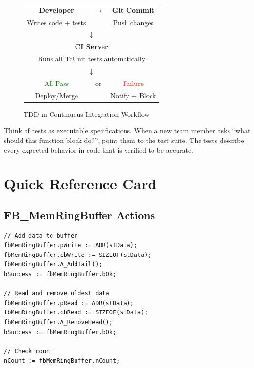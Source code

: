 \documentclass[11pt,a4paper]{article}
\begin{document}
\begin{figure}[h]
\centering
\begin{tabular}{|c|c|c|}
\hline
\textbf{Developer} & $\rightarrow$ & \textbf{Git Commit} \\
Writes code + tests & & Push changes \\
\hline
\multicolumn{3}{c}{$\downarrow$} \\
\hline
\multicolumn{3}{|c|}{\textbf{CI Server}} \\
\multicolumn{3}{|c|}{Runs all TcUnit tests automatically} \\
\hline
\multicolumn{3}{c}{$\downarrow$} \\
\hline
\textcolor{green}{All Pass} & or & \textcolor{red}{Failure} \\
Deploy/Merge & & Notify + Block \\
\hline
\end{tabular}
\caption{TDD in Continuous Integration Workflow}
\end{figure}

\begin{tipbox}
Think of tests as executable specifications. When a new team member asks ``what should this function block do?'', point them to the test suite. The tests describe every expected behavior in code that is verified to be accurate.
\end{tipbox}

\section*{Quick Reference Card}

\subsection*{FB\_MemRingBuffer Actions}

\begin{lstlisting}
// Add data to buffer
fbMemRingBuffer.pWrite := ADR(stData);
fbMemRingBuffer.cbWrite := SIZEOF(stData);
fbMemRingBuffer.A_AddTail();
bSuccess := fbMemRingBuffer.bOk;

// Read and remove oldest data
fbMemRingBuffer.pRead := ADR(stData);
fbMemRingBuffer.cbRead := SIZEOF(stData);
fbMemRingBuffer.A_RemoveHead();
bSuccess := fbMemRingBuffer.bOk;

// Check count
nCount := fbMemRingBuffer.nCount;
\end{lstlisting}
\end{document}
